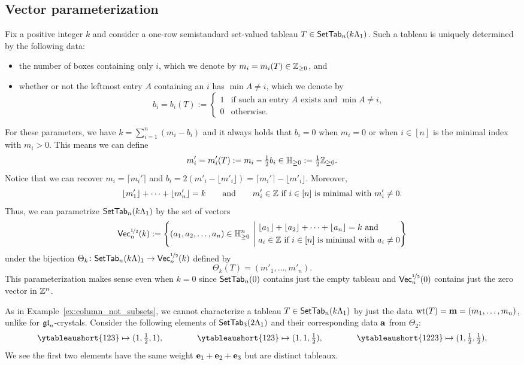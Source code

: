 \documentclass[11pt]{article}
\begin{document}
\subsection{Vector parameterization}\label{vec-param-sect}

Fix a positive integer $k$ and consider a one-row semistandard set-valued tableau $T \in \mathsf{SetTab}_n(k \Lambda_1)$.
Such a tableau is uniquely determined by the following data:
\begin{itemize}
\item the number of boxes containing only $i$, which we denote by $m_i=m_i(T) \in \mathbb{Z}_{\geq 0}$, and
\item whether or not the leftmost entry $A$ containing an $i$ has $\min A \neq i$, which we denote by 
\[
b_i  = b_i(T):= 
\begin{cases} 1 & \text{if such an entry $A$ exists and } \min A \neq i, \\ 0 & \text{otherwise.} \end{cases}
\]
\end{itemize}
For these parameters, we have $k = \sum_{i=1}^n (m_i - b_i)$ and it always holds that $b_i = 0$ when $m_i=0$ or when $i \in [n]$ is the minimal index with $m_i>0$.
This means we can define 
\[
m'_i= m'_i(T):= m_i - \tfrac{1}{2} b_i \in \mathbb{H}_{\geq 0} := \tfrac{1}{2}\mathbb{Z}_{\geq 0}.
\]
Notice that we can recover $m_i = \lceil m_i' \rceil$ and $b_i = 2 (m'_i - \lfloor m'_i \rfloor)= \lceil m_i' \rceil - \lfloor m'_i \rfloor$.
Moreover,   
\[ 
\lfloor m'_1 \rfloor + \dots  + \lfloor m'_n \rfloor 
=k
\qquad\text{and}\qquad
m'_i \in \mathbb{Z}\text{ if $i \in [n]$ is minimal with $m'_i\neq 0$.}
\]
Thus, we can parametrize $\mathsf{SetTab}_n(k \Lambda_1)$ by the set of vectors
\[
\VCrys{k} := \left\{ (a_1, a_2,\dotsc, a_n) \in \HH_{\geq 0}^n\ \middle\vert\ 
\ba
 &\lfloor a_1 \rfloor +\lfloor a_2 \rfloor + \cdots + \lfloor a_n \rfloor = k \text{ and} 
 \\
 &a_i \in \ZZ\text{ if $i \in [n]$ is minimal with $a_i\neq 0$} 
 \ea\right\}
\]
under the bijection $\Theta_k \colon \mathsf{SetTab}_n(k \Lambda)_1 \to \mathsf{Vec}^{\nicefrac{1}{2}}_n(k)$ defined by
\[
\Theta_k(T) = (m'_1, \dotsc, m'_n).
\]
This parameterization makes sense even when $k = 0$ since $\mathsf{SetTab}_n(0)$ contains just the empty tableau and $\mathsf{Vec}^{\nicefrac{1}{2}}_n(0)$ contains just the zero vector in $\mathbb{Z}^n$.

\begin{example}
\label{VCrys-ex1}
As in Example~\ref{ex:column_not_subsets}, we cannot characterize a tableau $T \in \mathsf{SetTab}_n(k \Lambda_1)$ by just the data $\operatorname{wt}(T) = \mathbf{m} = (m_1, \dotsc, m_n)$, unlike for $\mathfrak{gl}_n$-crystals.
Consider the following elements of $\mathsf{SetTab}_3(2\Lambda_1)$ and their corresponding data $\mathbf{a}$ from $\Theta_2$:
\[
\ytableaushort{{12}3} \mapsto (1,\tfrac{1}{2},1),
\qquad\qquad
\ytableaushort{1{23}} \mapsto (1,1,\tfrac{1}{2}),
\qquad\qquad
\ytableaushort{{12}{23}} \mapsto (1,\tfrac{1}{2},\tfrac{1}{2}),
\]
We see the first two elements have the same weight $\textbf{e}_1 + \textbf{e}_2 + \textbf{e}_3$ but are distinct tableaux.
\end{example}
\end{document}
